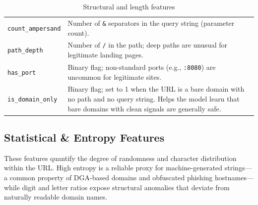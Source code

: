 \documentclass[12pt,a4paper]{article}
\begin{document}
\begin{table}[H]
\begin{tabularx}{\textwidth}{l >{\raggedright\arraybackslash}X}
        \addlinespace[4pt]
        \texttt{count\_ampersand}  & Number of \texttt{\&} separators in the query string (parameter count). \\
        \addlinespace[4pt]
        \texttt{path\_depth}       & Number of \texttt{/} in the path; deep paths are unusual for legitimate landing pages. \\
        \addlinespace[4pt]
        \texttt{has\_port}         & Binary flag; non-standard ports (e.g., \texttt{:8080}) are uncommon for legitimate sites. \\
        \addlinespace[4pt]
        \texttt{is\_domain\_only}  & Binary flag; set to 1 when the URL is a bare domain with no path and no query string. Helps the model learn that bare domains with clean signals are generally safe. \\
        \bottomrule
    \end{tabularx}
    \caption{Structural and length features}
    \label{tab:feat_structural}
\end{table}

\subsection{Statistical \& Entropy Features}

These features quantify the degree of randomness and character distribution within the URL. High entropy is a reliable proxy for machine-generated strings---a common property of DGA-based domains and obfuscated phishing hostnames---while digit and letter ratios expose structural anomalies that deviate from naturally readable domain names.
\end{document}
